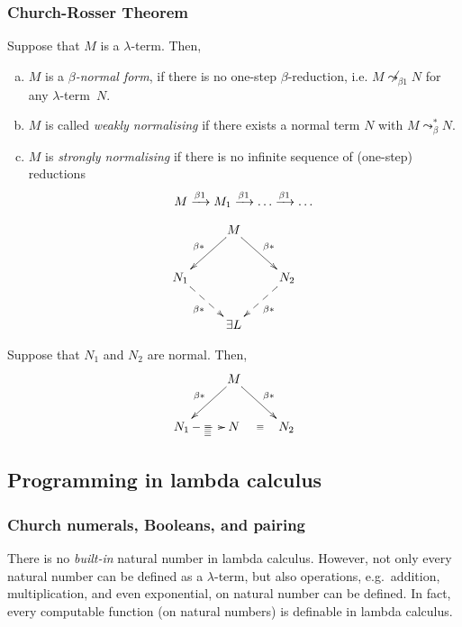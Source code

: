 \subsubsection*{Church-Rosser Theorem}
\begin{definition}
  Suppose that $M$ is a $\lambda$-term. Then, 
  \begin{enumerate}[(a)]
    \item $M$ is a \emph{$\beta$-normal form}, if there is no
      one-step $\beta$-reduction, i.e. $M \not\leadsto_{\beta1} N$ for any
      $\lambda$-term~$N$.
    \item $M$ is called \emph{weakly normalising} if there exists
      a normal term $N$ with $M \leadsto^*_{\beta} N$. 
    \item $M$ is \emph{strongly normalising} if there is no infinite sequence of
      (one-step) reductions 
      \[
        M \xrightarrow{\beta1} M_1 \xrightarrow{\beta1} \dots \xrightarrow{\beta1} \dots
      \]
  \end{enumerate}
\end{definition}
\begin{theorem}
  \[
    \xymatrix{
      & M \ar[rd]^{\beta*} \ar[ld]_{\beta*} \\
      N_1 \ar@{-->}[rd]_{\beta*} & & N_2 \ar@{-->}[ld]^{\beta*} \\
      & \exists L
    }
  \]
\end{theorem}
\begin{corollary}
  Suppose that $N_1$ and $N_2$ are normal. Then, 
  \[
    \xymatrix{
      & M \ar[rd]^{\beta*} \ar[ld]_{\beta*} \\
      N_1 \ar@{-->}[r]_{\equiv} \ar@{}[r]|\equiv & N & N_2 \ar@{}[l]|\equiv \\
    }
  \]
\end{corollary}
\subsection{Programming in lambda calculus}
\subsubsection*{Church numerals, Booleans, and pairing}
There is no \emph{built-in} natural number in lambda calculus. However, 
not only every natural number can be defined as a $\lambda$-term, but also 
operations, e.g.\ addition, multiplication, and even exponential, on natural
number can be defined. In fact, every computable function (on natural numbers)
is definable in lambda calculus. 

